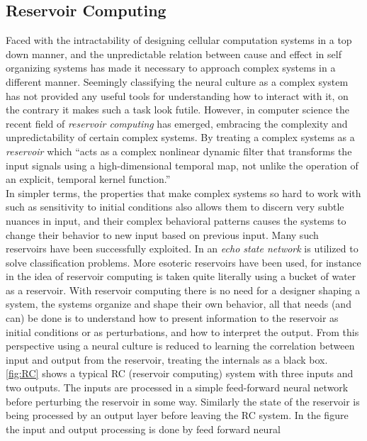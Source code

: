 \subsection{Reservoir Computing}
Faced with the intractability of designing cellular computation systems in a top
down manner, and the unpredictable relation between cause and effect in self organizing
systems has made it necessary to approach complex systems in a different manner.
Seemingly classifying the neural culture as a complex system has not provided
any useful tools for understanding how to interact with it, on the contrary it
makes such a task look futile.
However, in computer science the recent field of \textit{reservoir computing}
has emerged, embracing the complexity and unpredictability of certain complex
systems.
By treating a complex systems as a \textit{reservoir}
\cite{schrauwen_overview_2007} which
``acts as a complex nonlinear dynamic filter that transforms the
input signals using a high-dimensional temporal map, not unlike the operation
of an explicit, temporal kernel function.''\\
In simpler terms, the properties that make complex systems so hard to work with
such as sensitivity to initial conditions also allows them to discern very
subtle nuances in input, and their complex behavioral patterns causes the
systems to change their behavior to new input based on previous input.
Many such reservoirs have been successfully exploited.
In \cite{jaeger_adaptive_2003} an \textit{echo state network} 
is utilized to solve classification problems.
More esoteric reservoirs have been used, for instance in
\cite{natschlager_liquid_2002} the idea of reservoir computing is taken quite
literally using a bucket of water as a reservoir.
With reservoir computing there is no need for a designer shaping a system, the
systems organize and shape their own behavior, all that needs (and can) be done
is to understand how to present information to the reservoir as initial conditions
or as perturbations, and how to interpret the output.
From this perspective using a neural culture is reduced to
learning the correlation between input and output from the reservoir, treating
the internals as a black box.
\ref{fig:RC} shows a typical RC (reservoir computing) system with three inputs
and two outputs. The inputs are processed in a simple feed-forward neural
network before perturbing the reservoir in some way.
Similarly the state of the reservoir is being processed by an output layer
before leaving the RC system.
In the figure the input and output processing is done by feed forward neural

